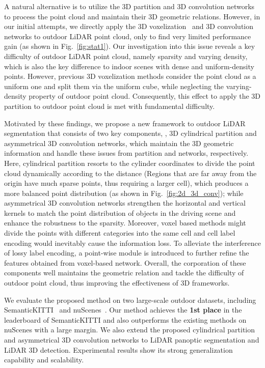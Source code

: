 \documentclass[final]{cvpr}
\begin{document}
   A natural alternative is to utilize the 3D partition and 3D convolution networks to process the point cloud and maintain their 3D geometric relations. However, in our initial attempts, we directly apply the 3D voxelization~\cite{graham20183d, cciccek20163d} and 3D convolution networks to outdoor LiDAR point cloud, only to find very limited performance gain (as shown in Fig.~\ref{fig:stat1}).
   Our investigation into this issue reveals a key difficulty of outdoor LiDAR point cloud, namely sparsity and varying density, which is also the key difference to indoor scenes with dense and uniform-density points. However, previous 3D voxelization methods consider the point cloud as a uniform one and split them via the uniform cube, while neglecting the varying-density property of outdoor point cloud. Consequently, this effect to apply the 3D partition to outdoor point cloud is met with fundamental difficulty.


   Motivated by these findings, we propose a new framework to outdoor LiDAR segmentation that consists of two key components, \ie, 3D cylindrical partition and asymmetrical 3D convolution networks, which maintain the 3D geometric information and handle these issues from partition and networks, respectively. Here, cylindrical partition resorts to the cylinder coordinates to divide the point cloud dynamically according to the distance (Regions that are far away from the origin have much sparse points, thus requiring a larger cell), which produces a more balanced point distribution (as shown in Fig.~\ref{fig:2d_3d_conv}); while asymmetrical 3D convolution networks strengthen the horizontal and vertical kernels to match the point distribution of objects in the driving scene and enhance the robustness to the sparsity. Moreover, voxel based methods might divide the points with different categories into the same cell and cell label encoding would inevitably cause the information loss. To alleviate the interference of lossy label encoding, a point-wise module is introduced to further refine the features obtained from voxel-based network. 
   Overall, the corporation of these components well maintains the geometric relation and tackle the difficulty of outdoor point cloud, thus improving the effectiveness of 3D frameworks.
   
   We evaluate the proposed method on two large-scale outdoor datasets, including SemanticKITTI~\cite{behley2019semantickitti} and nuScenes~\cite{nuscenes}. Our method achieves the \textbf{1st place} in the leaderboard of SemanticKITTI and also outperforms the existing methods on nuScenes with a large margin. We also extend the proposed cylindrical partition and asymmetrical 3D convolution networks to LiDAR panoptic segmentation and LiDAR 3D detection. Experimental results show its strong generalization capability and scalability.
   
\end{document}
